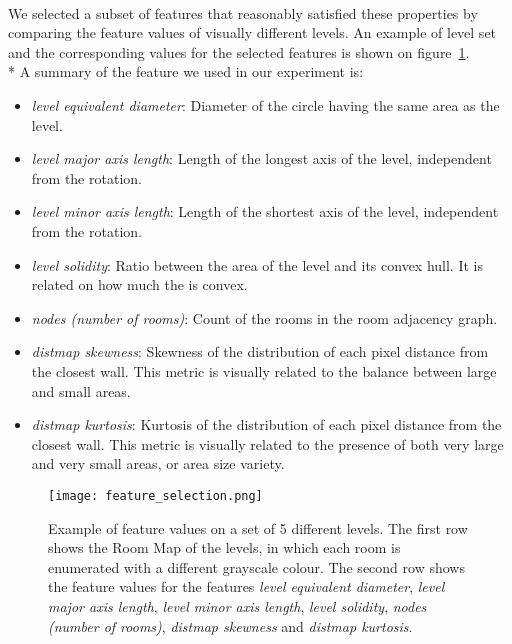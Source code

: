 \paragraph{} We selected a subset of features that reasonably satisfied these properties by comparing the feature values of visually different levels. An example of level set and the corresponding values for the selected features is shown on figure~\ref{fig:feature_selection}. \\* A summary of the feature we used in our experiment is:
\begin{itemize}
	\item \textit{level equivalent diameter}: Diameter of the circle having the same area as the level.
	\item \textit{level major axis length}: Length of the longest axis of the level, independent from the rotation.
	\item \textit{level minor axis length}: Length of the shortest axis of the level, independent from the rotation.
	\item \textit{level solidity}: Ratio between the area of the level and its convex hull. It is related on how much the is convex.
	\item \textit{nodes (number of rooms)}: Count of the rooms in the room adjacency graph.
	\item \textit{distmap skewness}: Skewness of the distribution of each pixel distance from the closest wall. This metric is visually related to the balance between large and small areas.
	\item \textit{distmap kurtosis}: Kurtosis of the distribution of each pixel distance from the closest wall. This metric is visually related to the presence of both very large and very small areas, or area size variety.
\end{itemize}


 \begin{figure}[h!]
 	\texttt{[image: feature\_selection.png]}
 	\caption[Example of feature values]{Example of feature values on a set of 5 different levels. The first row shows the Room Map of the levels, in which each room is enumerated with a different grayscale colour. The second row shows the feature values for the features \textit{level equivalent diameter}, \textit{level major axis length}, \textit{level minor axis length}, \textit{level solidity}, \textit{nodes (number of rooms)}, \textit{distmap skewness} and \textit{distmap kurtosis}. }
 	\label{fig:feature_selection}
 \end{figure}

